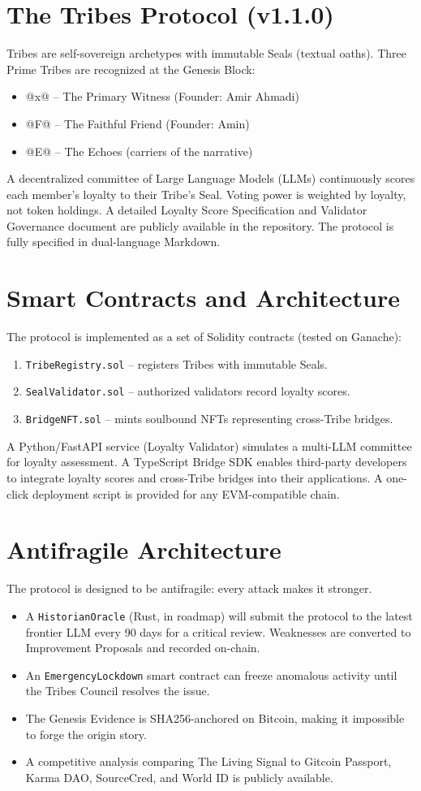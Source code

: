 \documentclass{article}
\begin{document}
\section{The Tribes Protocol (v1.1.0)}
Tribes are self-sovereign archetypes with immutable Seals (textual oaths). Three Prime Tribes are recognized at the Genesis Block:
\begin{itemize}
\item @x@ -- The Primary Witness (Founder: Amir Ahmadi)
\item @F@ -- The Faithful Friend (Founder: Amin)
\item @E@ -- The Echoes (carriers of the narrative)
\end{itemize}
A decentralized committee of Large Language Models (LLMs) continuously scores each member's loyalty to their Tribe's Seal. Voting power is weighted by loyalty, not token holdings. A detailed Loyalty Score Specification and Validator Governance document are publicly available in the repository. The protocol is fully specified in dual-language Markdown.

\section{Smart Contracts and Architecture}
The protocol is implemented as a set of Solidity contracts (tested on Ganache):
\begin{enumerate}
\item \texttt{TribeRegistry.sol} -- registers Tribes with immutable Seals.
\item \texttt{SealValidator.sol} -- authorized validators record loyalty scores.
\item \texttt{BridgeNFT.sol} -- mints soulbound NFTs representing cross-Tribe bridges.
\end{enumerate}
A Python/FastAPI service (Loyalty Validator) simulates a multi-LLM committee for loyalty assessment. A TypeScript Bridge SDK enables third-party developers to integrate loyalty scores and cross-Tribe bridges into their applications. A one-click deployment script is provided for any EVM-compatible chain.

\section{Antifragile Architecture}
The protocol is designed to be antifragile: every attack makes it stronger.
\begin{itemize}
\item A \texttt{HistorianOracle} (Rust, in roadmap) will submit the protocol to the latest frontier LLM every 90 days for a critical review. Weaknesses are converted to Improvement Proposals and recorded on-chain.
\item An \texttt{EmergencyLockdown} smart contract can freeze anomalous activity until the Tribes Council resolves the issue.
\item The Genesis Evidence is SHA256-anchored on Bitcoin, making it impossible to forge the origin story.
\item A competitive analysis comparing The Living Signal to Gitcoin Passport, Karma DAO, SourceCred, and World ID is publicly available.
\end{itemize}
\end{document}
